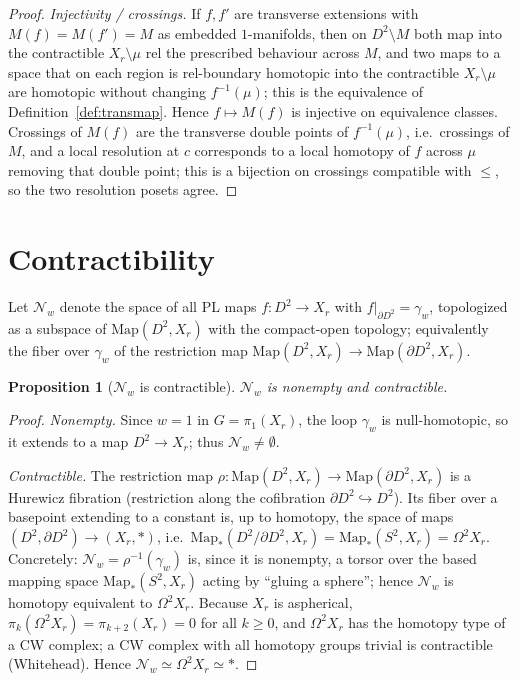 \documentclass[11pt]{article}
\newtheorem{proposition}{Proposition}
\theoremstyle{definition}
\theoremstyle{remark}
\newcommand{\bdy}{\partial}
\newcommand{\rose}{X_r}
\begin{document}
\begin{proof}
\emph{Injectivity / crossings.} If $f,f'$ are transverse extensions with
$M(f)=M(f')=M$ as embedded $1$-manifolds, then on $D^2\setminus M$ both map into
the contractible $\rose\setminus\mu$ rel the prescribed behaviour across $M$, and
two maps to a space that on each region is rel-boundary homotopic into the
contractible $\rose\setminus\mu$ are homotopic without changing $f^{-1}(\mu)$;
this is the equivalence of Definition~\ref{def:transmap}. Hence
$f\mapsto M(f)$ is injective on equivalence classes. Crossings of $M(f)$ are the
transverse double points of $f^{-1}(\mu)$, i.e.\ crossings of $M$, and a local
resolution at $c$ corresponds to a local homotopy of $f$ across $\mu$ removing
that double point; this is a bijection on crossings compatible with $\le$, so the
two resolution posets agree.
\end{proof}

\section{Contractibility}\label{sec:contr}

Let $\mathcal N_w$ denote the space of all PL maps $f\colon D^2\to\rose$ with
$f|_{\bdy D^2}=\gamma_w$, topologized as a subspace of $\mathrm{Map}(D^2,\rose)$
with the compact-open topology; equivalently the fiber over $\gamma_w$ of the
restriction map $\mathrm{Map}(D^2,\rose)\to\mathrm{Map}(\bdy D^2,\rose)$.

\begin{proposition}[$\mathcal N_w$ is contractible]\label{prop:nullcontr}
$\mathcal N_w$ is nonempty and contractible.
\end{proposition}

\begin{proof}
\emph{Nonempty.} Since $w=1$ in $G=\pi_1(\rose)$, the loop $\gamma_w$ is
null-homotopic, so it extends to a map $D^2\to\rose$; thus $\mathcal N_w\ne
\emptyset$.

\emph{Contractible.} The restriction map
$\rho\colon\mathrm{Map}(D^2,\rose)\to\mathrm{Map}(\bdy D^2,\rose)$ is a Hurewicz
fibration (restriction along the cofibration $\bdy D^2\hookrightarrow D^2$). Its
fiber over a basepoint extending to a constant is, up to homotopy, the space of
maps $(D^2,\bdy D^2)\to(\rose,\ast)$, i.e.\ $\mathrm{Map}_\ast(D^2/\bdy
D^2,\rose)=\mathrm{Map}_\ast(S^2,\rose)=\Omega^2\rose$. Concretely: $\mathcal
N_w=\rho^{-1}(\gamma_w)$ is, since it is nonempty, a torsor over the based mapping
space $\mathrm{Map}_\ast(S^2,\rose)$ acting by ``gluing a sphere''; hence
$\mathcal N_w$ is homotopy equivalent to $\Omega^2\rose$. Because $\rose$ is
aspherical, $\pi_k(\Omega^2\rose)=\pi_{k+2}(\rose)=0$ for all $k\ge0$, and
$\Omega^2\rose$ has the homotopy type of a CW complex; a CW complex with all
homotopy groups trivial is contractible (Whitehead). Hence $\mathcal N_w\simeq
\Omega^2\rose\simeq\ast$.
\end{proof}
\end{document}
